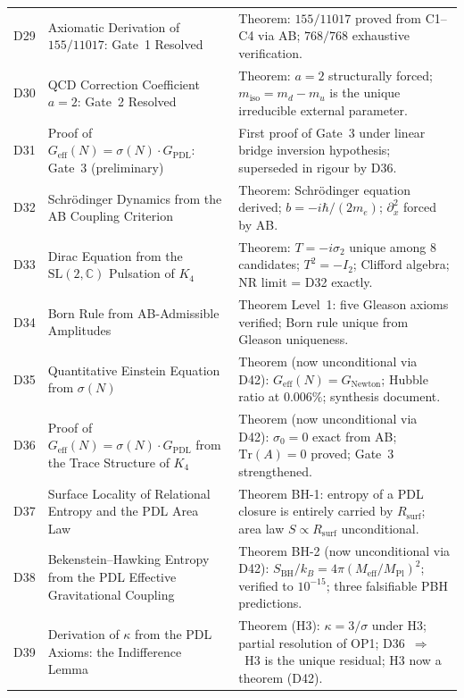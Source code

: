 \documentclass[11pt,a4paper]{article}
\theoremstyle{plain}
\theoremstyle{definition}
\theoremstyle{remark}
\newcommand{\Geff}{G_{\mathrm{eff}}}
\newcommand{\GPDL}{G_{\mathrm{PDL}}}
\newcommand{\Rsurf}{R_{\mathrm{surf}}}
\newcommand{\sigmaN}{\sigma(N)}
\newcommand{\SBH}{S_{\mathrm{BH}}}
\newcommand{\Meff}{M_{\mathrm{eff}}}
\newcommand{\MPl}{M_{\mathrm{Pl}}}
\begin{document}
\begin{longtable}{L{1.3cm}L{3.8cm}L{8.0cm}}
D29 & Axiomatic Derivation of $155/11017$: Gate~1 Resolved~\cite{D29} & \textcolor{proofblue}{Theorem}: $155/11017$ proved from C1--C4 via AB; $768/768$ exhaustive verification.\\[0.3em]
D30 & QCD Correction Coefficient $a=2$: Gate~2 Resolved~\cite{D30} & \textcolor{proofblue}{Theorem}: $a=2$ structurally forced; $m_{\mathrm{iso}}=m_d-m_u$ is the unique irreducible external parameter.\\[0.3em]
D31 & Proof of $\Geff(N)=\sigmaN\cdot\GPDL$: Gate~3 (preliminary)~\cite{D31} & First proof of Gate~3 under linear bridge inversion hypothesis; superseded in rigour by D36.\\[0.3em]
D32 & Schr\"odinger Dynamics from the AB Coupling Criterion~\cite{D32} & \textcolor{proofblue}{Theorem}: Schr\"odinger equation derived; $b=-i\hbar/(2m_e)$; $\partial_x^2$ forced by AB.\\[0.3em]
D33 & Dirac Equation from the $\mathrm{SL}(2,\mathbb{C})$ Pulsation of $K_4$~\cite{D33} & \textcolor{proofblue}{Theorem}: $T=-i\sigma_2$ unique among 8 candidates; $T^2=-I_2$; Clifford algebra; NR limit = D32 exactly.\\[0.3em]
D34 & Born Rule from AB-Admissible Amplitudes~\cite{D34} & \textcolor{proofblue}{Theorem} Level~1: five Gleason axioms verified; Born rule unique from Gleason uniqueness.\\[0.3em]
D35 & Quantitative Einstein Equation from $\sigmaN$~\cite{D35} & \textcolor{proofblue}{Theorem} (now unconditional via D42): $G_{\mathrm{eff}}(N)=G_{\mathrm{Newton}}$; Hubble ratio at $0.006\%$; synthesis document.\\[0.3em]
D36 & Proof of $\Geff(N)=\sigmaN\cdot\GPDL$ from the Trace Structure of $K_4$~\cite{D36} & \textcolor{proofblue}{Theorem} (now unconditional via D42): $\sigma_0=0$ exact from AB; $\mathrm{Tr}(A)=0$ proved; Gate~3 strengthened.\\[0.4em]
D37 & Surface Locality of Relational Entropy and the PDL Area Law~\cite{D37} & \textcolor{proofblue}{Theorem BH-1}: entropy of a PDL closure is entirely carried by $\Rsurf$; area law $S\propto\Rsurf$ unconditional.\\[0.3em]
D38 & Bekenstein--Hawking Entropy from the PDL Effective Gravitational Coupling~\cite{D38} & \textcolor{proofblue}{Theorem BH-2} (now unconditional via D42): $\SBH/k_B=4\pi(\Meff/\MPl)^2$; verified to $10^{-15}$; three falsifiable PBH predictions.\\[0.3em]
D39 & Derivation of $\kappa$ from the PDL Axioms: the Indifference Lemma~\cite{D39} & \textcolor{proofblue}{Theorem (H3)}: $\kappa=3/\sigma$ under H3; partial resolution of OP1; D36~$\Rightarrow$~H3 is the unique residual; H3 now a theorem (D42).\\[0.4em]

\end{longtable}
\end{document}
